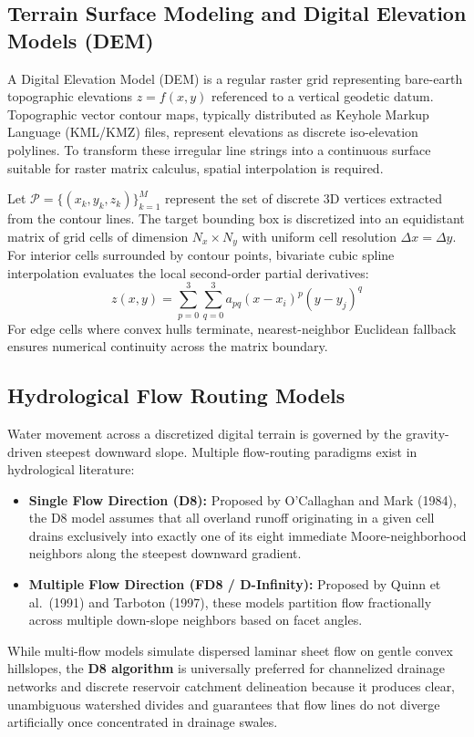 \documentclass[11pt,a4paper]{article}
\begin{document}
\subsection{Terrain Surface Modeling and Digital Elevation Models (DEM)}
A Digital Elevation Model (DEM) is a regular raster grid representing bare-earth topographic elevations $z = f(x, y)$ referenced to a vertical geodetic datum. Topographic vector contour maps, typically distributed as Keyhole Markup Language (KML/KMZ) files, represent elevations as discrete iso-elevation polylines. To transform these irregular line strings into a continuous surface suitable for raster matrix calculus, spatial interpolation is required. 

Let $\mathcal{P} = \{(x_k, y_k, z_k)\}_{k=1}^M$ represent the set of discrete 3D vertices extracted from the contour lines. The target bounding box is discretized into an equidistant matrix of grid cells of dimension $N_x \times N_y$ with uniform cell resolution $\Delta x = \Delta y$. For interior cells surrounded by contour points, bivariate cubic spline interpolation evaluates the local second-order partial derivatives:
\begin{equation}
z(x, y) = \sum_{p=0}^3 \sum_{q=0}^3 a_{pq} (x - x_i)^p (y - y_j)^q
\label{eq:spline}
\end{equation}
For edge cells where convex hulls terminate, nearest-neighbor Euclidean fallback ensures numerical continuity across the matrix boundary.

\subsection{Hydrological Flow Routing Models}
Water movement across a discretized digital terrain is governed by the gravity-driven steepest downward slope. Multiple flow-routing paradigms exist in hydrological literature:
\begin{itemize}[noitemsep,topsep=2pt]
    \item \textbf{Single Flow Direction (D8):} Proposed by O'Callaghan and Mark (1984), the D8 model assumes that all overland runoff originating in a given cell drains exclusively into exactly one of its eight immediate Moore-neighborhood neighbors along the steepest downward gradient.
    \item \textbf{Multiple Flow Direction (FD8 / D-Infinity):} Proposed by Quinn et al.\ (1991) and Tarboton (1997), these models partition flow fractionally across multiple down-slope neighbors based on facet angles.
\end{itemize}
While multi-flow models simulate dispersed laminar sheet flow on gentle convex hillslopes, the \textbf{D8 algorithm} is universally preferred for channelized drainage networks and discrete reservoir catchment delineation because it produces clear, unambiguous watershed divides and guarantees that flow lines do not diverge artificially once concentrated in drainage swales.
\end{document}
